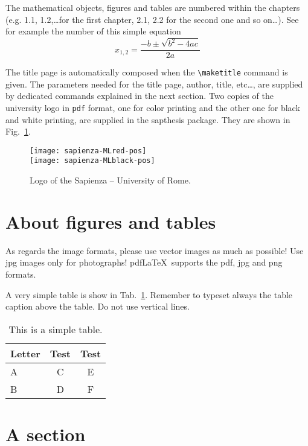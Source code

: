 \documentclass[LaM,binding=0.6cm]{sapthesis}
\newcommand{\bs}{\textbackslash}
\begin{document}
The mathematical objects, figures and tables are numbered within the chapters (e.g. 1.1, 1.2,\ldots for the first chapter, 2.1, 2.2 for the second one and so on\ldots). See for example the number of this simple equation
\begin{equation}
x_{1,2}=\frac{-b\pm\sqrt{b^2-4ac}}{2a}
\end{equation}


The title page is automatically composed when the \texttt{\bs maketitle} command is given.
The parameters needed for the title page, author, title, etc\ldots , are supplied by dedicated commands explained in the next section.
Two copies of the university logo in \texttt{pdf} format, one for color printing and the other one for black and white printing, are supplied in the \textsf{sapthesis} package. They are shown in Fig.~\ref{fig:largenenough}.

\begin{figure}
\centering
\texttt{[image: sapienza-MLred-pos]}\\[3ex]
\texttt{[image: sapienza-MLblack-pos]}
\caption{Logo of the Sapienza -- University of Rome.}
\label{fig:largenenough}
\end{figure}



\section{About figures and tables}

As regards the image formats, please use vector images as much as possible! Use jpg images only for photographs! pdf\LaTeX\ supports the pdf, jpg and png formats.

A very simple table is show in Tab.~\ref{tab:letters}. Remember to typeset
always the table caption above the table. Do not use vertical lines.

\begin{table}
\caption{This is a simple table.}
\label{tab:letters}
\centering
\begin{tabular}{lcc}
\toprule
Letter & Test & Test \\
\midrule
A & C & E \\
B & D & F \\
\bottomrule
\end{tabular}
\end{table}


\section{A section}
\end{document}
